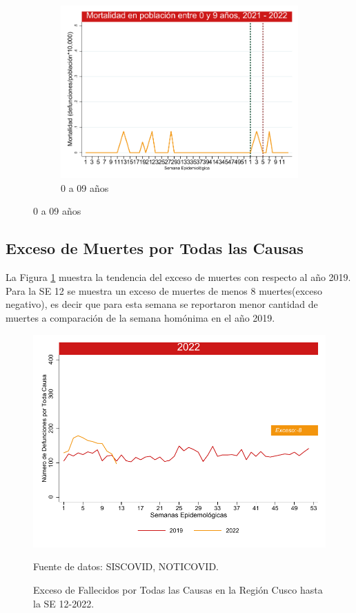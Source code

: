 \documentclass[12pt,a4paper,openany]{book}
\begin{document}
\begin{figure}[h]
	\vspace{10mm}
	\begin{subfigure}[b]{0.45\textwidth}
		\centering
		\includegraphics[width=\textwidth]{../figuras/mortalidad_edad_0.pdf}
		\caption{0 a 09 años}
	\end{subfigure}
\end{figure}
\clearpage	
	\subsection*{Exceso de Muertes por Todas las Causas}
\noindent La Figura \ref{fig:exceso_regional} muestra la tendencia del exceso de muertes con respecto al año 2019. Para la SE 12 se muestra un exceso de muertes de menos 8 muertes(exceso negativo), es decir que para esta semana se reportaron menor cantidad de muertes a comparación de la semana homónima en el año 2019. 

	\begin{figure}[h]
	\caption{Exceso de Fallecidos por Todas las Causas en la Región Cusco hasta la SE 12-2022.}\label{fig:exceso_regional}
	\begin{center}
		\includegraphics[width=0.85\linewidth]{../figuras/exceso_region_2022.pdf}
	\end{center}
	{\footnotesize {Fuente de datos: SISCOVID, NOTICOVID.}}
	\end{figure}
\clearpage
\end{document}
